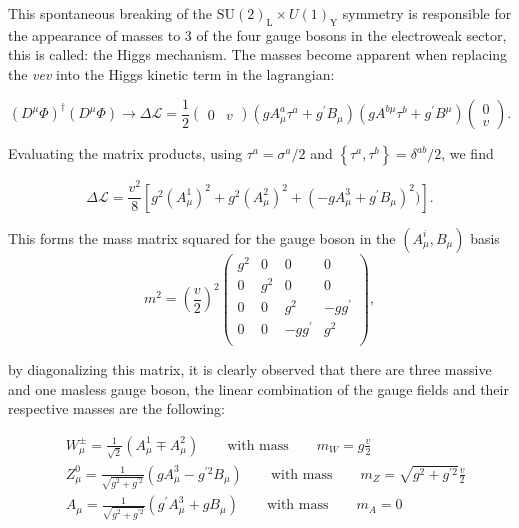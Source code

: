 This spontaneous breaking of the $\mathrm{SU(2)_{L}}\times
U(1)_{\mathrm{Y}}$ symmetry is responsible for the appearance of
masses to 3 of the four gauge bosons in the electroweak sector, this
is called: the Higgs mechanism. The masses become apparent when
replacing the \textit{vev} into the Higgs kinetic term in the
lagrangian:

\begin{equation}
\label{eq:HiggsMass}
(D^{\mu}\Phi)^{\dagger}(D^{\mu}\Phi) \rightarrow
\Delta\mathcal{L} = \frac{1}{2}\begin{pmatrix} 0 & v\end{pmatrix} (gA_{\mu}^{a}\tau^{a} + g^{\prime}B_{\mu})(gA^{b\mu}\tau^{b} +g^{\prime}B^{\mu}) \begin{pmatrix} 0\\
  v\end{pmatrix}.
\end{equation}

Evaluating the matrix products, using $\tau^{a}=\sigma^{a}/2$ and
$\left\{\tau^{a},\tau^{b}\right\} = \delta^{ab}/2$, we find

 
\begin{equation}
\label{eq:HiggsMass2}
\Delta\mathcal{L} = \frac{\mathit{v}^{2}}{8}\left[g^{2}(A^{1}_{\mu})^2
  +g^{2}(A^{2}_{\mu})^2 + (-gA^{3}_{\mu}+g^{\prime}B_{\mu})^2)\right].
\end{equation}

This forms the mass matrix squared for the gauge boson in the
$(A^{i}_{\mu}, B_{\mu})$ basis
\begin{equation}
\label{eq:HiggsMass}
m^{2} = \left(\frac{v}{2}\right)^{2}
\begin{pmatrix} g^{2} & 0 & 0 & 0\\
0 & g^{2} & 0 & 0\\
0 & 0 & g^{2} & -gg^{\prime}\\
0 & 0 & -gg^{\prime} & g^{2}\\
\end{pmatrix},
\end{equation}

by diagonalizing this matrix, it is clearly observed that there are three
massive and one masless gauge boson, the linear combination of the
gauge fields and their respective masses are the following:

\begin{equation}
 \begin{aligned}
       &W^{\pm}_{\mu} = \frac{1}{\sqrt{2}}(A^{1}_{\mu}\mp A^{2}_{\mu})
        \qquad \text{with mass}  \qquad  m_{W} = g\frac{v}{2}\\
        & 
        Z^{0}_{\mu} = \frac{1}{\sqrt{g^{2}+g^{\prime
              2}}}(gA^{3}_{\mu}- g^{\prime 2}B_{\mu})
        \qquad \text{with mass}  \qquad  m_{Z} = \sqrt{g^{2}+g^{\prime
            2}}\frac{v}{2}\\
        &
        A_{\mu} = \frac{1}{\sqrt{g^{2}+g^{\prime
              2}}}(g^{\prime}A^{3}_{\mu}+ gB_{\mu})
        \qquad \text{with mass}  \qquad  m_{A} = 0
       \end{aligned}
\label{eq:BosonMasses}
\end{equation}

